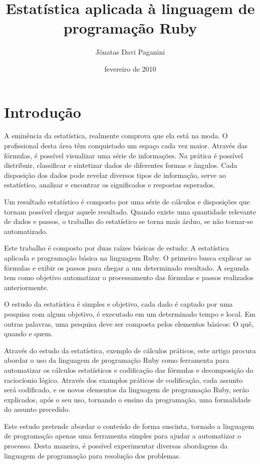 \documentclass[espaco=simples,appendix=Name]{abnt}
\title{Estatística aplicada à linguagem de programação Ruby}
\author{Jônatas Davi Paganini}
\date{fevereiro de 2010}
\begin{document}
\maketitle

\chapter{Introdução}

A eminência da estatística, realmente comprova que ela está na moda. O profissional desta área têm conquistado um espaço cada vez maior. Através das fórmulas, é possível visualizar uma série de informações. Na prática é possível distribuir, classificar e sintetizar dados de diferentes formas e ângulos. Cada disposição dos dados pode revelar diversos tipos de informação, serve ao estatístico, analisar e encontrar os significados e respostas esperados.

Um resultado estatístico é composto por uma série de cálculos e disposições que tornam possível chegar aquele resultado. Quando existe uma quantidade relevante de dados e passos, o trabalho do estatístico se torna mais árduo, se não tornar-se automatizado.

Este trabalho é composto por duas raízes básicas de estudo: A estatística aplicada e programação básica na linguagem Ruby. O primeiro busca explicar as fórmulas e exibir os passos para chegar a um determinado resultado. A segunda tem como objetivo automatizar o processamento das fórmulas e passos realizados anteriormente.

O estudo da estatística é simples e objetivo, cada dado é captado por uma pesquisa com algum objetivo, é executado em um determinado tempo e local. Em outras palavras, uma pesquisa deve ser composta pelos elementos básicos: O quê, quando e quem.

Através do estudo da estatística, exemplo de cálculos práticos, este artigo procura abordar o uso da linguagem de programação Ruby como ferramenta para automatizar os cálculos estatísticos e codificação das fórmulas e decomposição do raciocíonio lógico. Através dos examplos práticos de codificação, cada assunto será codificado, e os novos elementos da linguagem de programação Ruby, serão explicados, após o seu uso, tornando o ensino da programação, uma formalidade do assunto precedido.

Este estudo pretende abordar o conteúdo de forma suscinta, tornado a linguagem de programação apenas uma ferramenta simples para ajudar a automatizar o processo. Desta maneira, é possível experimentar diversas abordagens da linguagem de programação para resolução dos problemas.  
\end{document}
